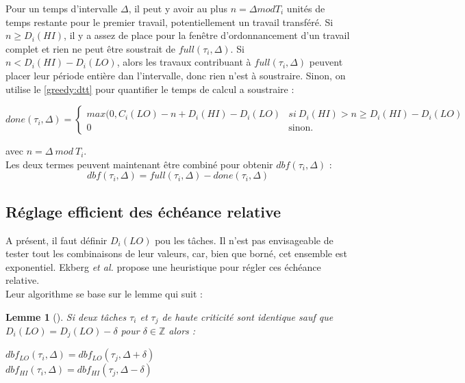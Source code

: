 \documentclass[12pt,a4paper,oneside]{book}
\theoremstyle{break}
\theoremstyle{breakplain}
\newtheorem{lem}{Lemme}[chapter]
\begin{document}
Pour un temps d'intervalle $\Delta$, il peut y avoir au plus $n = \Delta mod T_i$ unités de temps restante pour le premier travail, potentiellement un travail transféré. Si $n \ge D_i(HI)$, il y a assez de place pour la fenêtre d'ordonnancement d'un travail complet et rien ne peut être soustrait de $full(\tau_i, \Delta)$. Si $n < D_i(HI) - D_i(LO)$, alors les travaux contribuant à $full(\tau_i, \Delta)$ peuvent placer leur période entière dan l'intervalle, donc rien n'est à soustraire. Sinon, on utilise le \autoref{greedy:dtt} pour quantifier le temps de calcul a soustraire :
\begin{center}
$$
done(\tau_i, \Delta) = \left\{
    \begin{array}{ll}
        max(0, C_i(LO)-n+D_i(HI) - D_i(LO) & si\ D_i(HI) > n \ge D_i(HI) - D_i(LO) \\
        0 & \mbox{sinon.}
    \end{array}
\right.
$$
\end{center}
avec $n = \Delta\ mod\ T_i$.\\
Les deux termes peuvent maintenant être combiné pour obtenir $dbf(\tau_i, \Delta)$ :
\begin{equation}
dbf(\tau_i, \Delta) = full(\tau_i, \Delta) - done(\tau_i, \Delta)
\end{equation}

\subsection{Réglage efficient des échéance relative}

A présent, il faut définir $D_i(LO)$ pou les tâches. Il n'est pas envisageable de tester tout les combinaisons de leur valeurs, car, bien que borné, cet ensemble est exponentiel. Ekberg \textit{et al.} propose une heuristique pour régler ces échéance relative.\\

Leur algorithme se base sur le lemme qui suit :

\begin{lem}[\cite{ekberg2012outstanding}]
Si deux tâches $\tau_i$ et $\tau_j$ de haute criticité sont identique sauf que $D_i(LO) = D_j(LO) - \delta$ pour $\delta \in \mathbb{Z}$ alors :
\begin{center}

$dbf_{LO}(\tau_i, \Delta) = dbf_{LO}(\tau_j, \Delta + \delta) $\\
$dbf_{HI}(\tau_i, \Delta) = dbf_{HI}(\tau_j, \Delta - \delta)$

\end{center} 
\end{lem}
\end{document}
